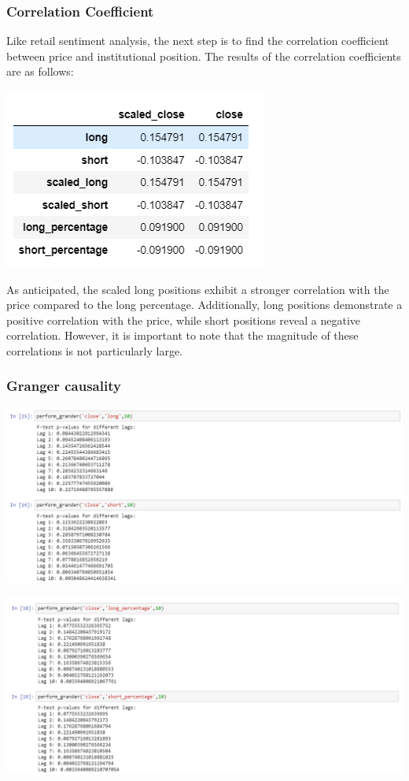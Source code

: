 \documentclass{article}
\begin{document}
\subsubsection{Correlation Coefficient}
Like retail sentiment analysis, the next step is to find the correlation coefficient between price and institutional position. The results of the correlation coefficients are as follows:
\begin{center}
    \includegraphics[scale=1]{p10.png}    
\end{center}
As anticipated, the scaled long positions exhibit a stronger correlation with the price compared to the long percentage. Additionally, long positions demonstrate a positive correlation with the price, while short positions reveal a negative correlation. However, it is important to note that the magnitude of these correlations is not particularly large.
\subsubsection{Granger causality}

\begin{center}
    \includegraphics[scale=1]{p11.png}    
\end{center}

\begin{center}
    \includegraphics[scale=1]{p12.png}    
\end{center}
\end{document}
